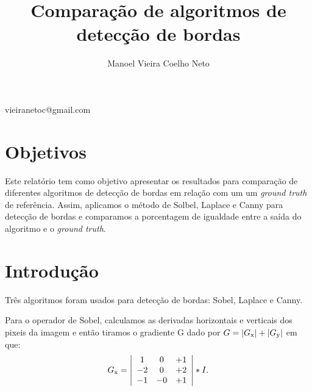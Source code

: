 \documentclass[conference,harvard,brazil,english]{sbatex}
\begin{document}
	\title{Comparação de algoritmos de detecção de bordas}
	\author{Manoel Vieira Coelho Neto}{vieiranetoc@gmail.com}
	\address{SQS 203 Bloco J\\ Brasília, DF, Brasil}
	
	\twocolumn[{
		\maketitle		
	}]
	\section{Objetivos}
	\par Este relatório tem como objetivo apresentar os resultados para comparação de diferentes algoritmos de detecção de bordas em relação com um um \textit{ground truth} de referência. Assim, aplicamos o método de Solbel, Laplace e Canny para detecção de bordas e comparamos a porcentagem de igualdade entre a saída do algoritmo e o \textit{ground truth}.
	
	\section{Introdução}
		\par Três algoritmos foram usados para detecção de bordas: Sobel, Laplace e Canny.
		\par Para o operador de Sobel, calculamos as derivadas horizontais e verticais dos pixeis da imagem e então tiramos o gradiente G dado por $G = |G\textsubscript{x}|+|G\textsubscript{y}|$ em que:\newline
			\[ G\textsubscript{x} = \left| \begin{array}{ccc}
			\-1 & 0 & +1 \\
			-2 & 0  & +2 \\
			-1 & -0 & +1 \end{array}\right| * I.\]
			
\end{document}
